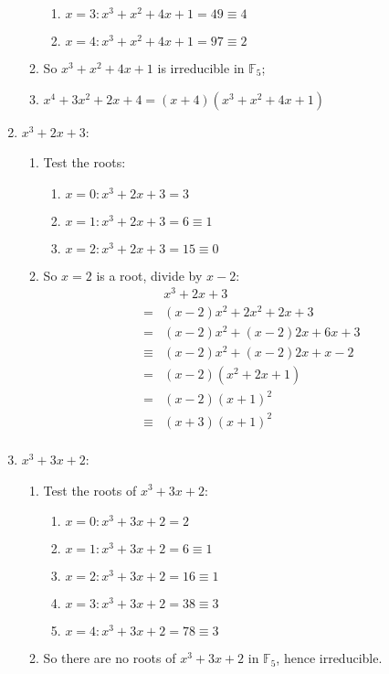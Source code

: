 \documentclass{article}
\begin{document}
\begin{enumerate}
\begin{enumerate}
\begin{enumerate}
            \item $x=3:x^3+x^2+4x+1=49\equiv 4$
            \item $x=4:x^3+x^2+4x+1=97\equiv 2$
        \end{enumerate}
        \item So $x^3+x^2+4x+1$ is irreducible in $\mathbb{F}_5$;
        \item $x^4+3x^2+2x+4=(x+4)(x^3+x^2+4x+1)$
    \end{enumerate}
     \item $x^3+2x+3$:
     \begin{enumerate}
         \item Test the roots:
         \begin{enumerate}
             \item $x=0:x^3+2x+3=3$
             \item $x=1:x^3+2x+3=6\equiv 1$
             \item $x=2:x^3+2x+3=15\equiv 0$
         \end{enumerate}
         \item So $x=2$ is a root, divide by $x-2$:
         \begin{align*}
             &x^3+2x+3\\
             =&(x-2)x^2+2x^2+2x+3\\
             =&(x-2)x^2+(x-2)2x+6x+3\\
             \equiv&(x-2)x^2+(x-2)2x+x-2\\
             =&(x-2)(x^2+2x+1)\\
             =&(x-2)(x+1)^2\\
             \equiv&(x+3)(x+1)^2\\
         \end{align*}
     \end{enumerate}
     \item $x^3+3x+2$:
    \begin{enumerate}
        \item Test the roots of $x^3+3x+2$:
        \begin{enumerate}
         \item $x=0:x^3+3x+2=2$
         \item $x=1:x^3+3x+2=6\equiv 1$
         \item $x=2:x^3+3x+2=16\equiv 1$
         \item $x=3:x^3+3x+2=38\equiv 3$
         \item $x=4: x^3+3x+2=78\equiv 3$
        \end{enumerate}
        \item So there are no roots of $x^3+3x+2$ in $\mathbb{F}_5$, hence irreducible.
    \end{enumerate}
\end{enumerate}
\end{document}

